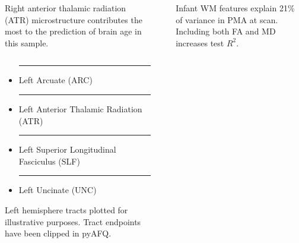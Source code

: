 \documentclass[final]{beamer}
\newlength{\sepwidth}
\newlength{\colwidth}
\newcommand{\separatorcolumn}{\begin{column}{\sepwidth}\end{column}}
\begin{document}
\begin{frame}[t]
\begin{columns}[t]
\begin{column}{\colwidth}
\begin{block}{Right anterior thalamic radiation (ATR) microstructure contributes the most to the prediction of brain age in this sample.}
\begin{columns}[t]
      \begin{column}{0.46\textwidth}
        \vspace{-10pt}
        \begin{tcolorbox}[colback=gray!50, colframe=cardinalred, width=\linewidth]
          {\fontsize{9.5}{10}\selectfont
          \begin{itemize}
            \item \textcolor[rgb]{1.0, 1.0, 0.4}{\rule{0.8cm}{0.3cm}} Left Arcuate (ARC)
            \item \textcolor[rgb]{0.2, 0.4, 0.6}{\rule{0.8cm}{0.3cm}} Left Anterior Thalamic Radiation (ATR) 
            \item \textcolor[rgb]{1.0, 0.4, 0.0}{\rule{0.8cm}{0.3cm}} Left Superior Longitudinal Fasciculus (SLF) 
            \item \textcolor[rgb]{0.0, 0.6, 0.2}{\rule{0.8cm}{0.3cm}} Left Uncinate (UNC)
          \end{itemize}
          Left hemisphere tracts plotted for illustrative purposes. Tract endpoints have been clipped in pyAFQ.}
        \end{tcolorbox}
      \end{column}
    \end{columns}
    
  \end{block}

\end{column}

\separatorcolumn

\begin{column}{\colwidth}
  \vspace{-15pt}
  \begin{block}{Infant WM features explain 21\% of variance in PMA at scan. Including both FA and MD increases test $R^2$.}


\end{block}
\end{column}
\end{columns}
\end{frame}
\end{document}
